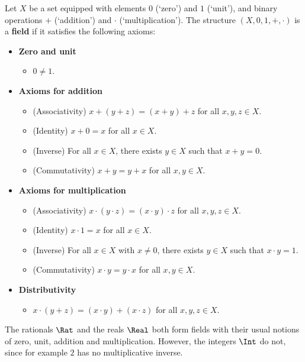 \begin{axioms}
\label{axField}
Let $X$ be a set equipped with elements $0$ (`zero') and $1$ (`unit'), and binary operations $+$ (`addition') and $\cdot$ (`multiplication'). The structure $(X,0,1,+,{\cdot})$ is a \textbf{field} if it satisfies the following axioms:
\begin{itemize}
\item \textbf{Zero and unit}
\begin{itemize}[leftmargin=30pt]
\item[(F1)] $0 \ne 1$.
\end{itemize}
\item \textbf{Axioms for addition}
\begin{itemize}[leftmargin=30pt]
\item[(F2)] (Associativity) $x+(y+z) = (x+y)+z$ for all $x,y,z \in X$.
\item[(F3)] (Identity) $x+0=x$ for all $x \in X$.
\item[(F4)] (Inverse) For all $x \in X$, there exists $y \in X$ such that $x+y=0$.
\item[(F5)] (Commutativity) $x+y=y+x$ for all $x,y \in X$.
\end{itemize}
\item \textbf{Axioms for multiplication}
\begin{itemize}[leftmargin=30pt]
\item[(F6)] (Associativity) $x \cdot (y \cdot z) = (x \cdot y) \cdot z$ for all $x,y,z \in X$.
\item[(F7)] (Identity) $x \cdot 1 = x$ for all $x \in X$.
\item[(F8)] (Inverse) For all $x \in X$ with $x \ne 0$, there exists $y \in X$ such that $x \cdot y = 1$.
\item[(F9)] (Commutativity) $x \cdot y = y \cdot x$ for all $x,y \in X$.
\end{itemize}
\item \textbf{Distributivity}
\begin{itemize}[leftmargin=30pt]
\item[(F10)] $x \cdot (y + z) = (x \cdot y) + (x \cdot z)$ for all $x,y,z \in X$.
\end{itemize}
\end{itemize}
\end{axioms}

\begin{example}
The rationals $\Rat$ and the reals $\Real$ both form fields with their usual notions of zero, unit, addition and multiplication. However, the integers $\Int$ do not, since for example $2$ has no multiplicative inverse.
\end{example}

